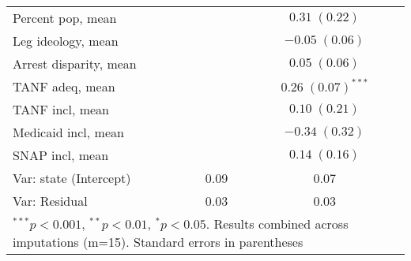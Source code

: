\begin{table}
\begin{center}
\begin{tabular}{l c c }
Percent pop, mean          &                         & $0.31 \; (0.22)$       \\
Leg ideology, mean         &                         & $-0.05 \; (0.06)$      \\
Arrest disparity, mean     &                         & $0.05 \; (0.06)$       \\
TANF adeq, mean            &                         & $0.26 \; (0.07)^{***}$ \\
TANF incl, mean            &                         & $0.10 \; (0.21)$       \\
Medicaid incl, mean        &                         & $-0.34 \; (0.32)$      \\
SNAP incl, mean            &                         & $0.14 \; (0.16)$       \\
\hline
Var: state (Intercept)     & 0.09                    & 0.07                   \\
Var: Residual              & 0.03                    & 0.03                   \\
\hline
\multicolumn{3}{l}{\scriptsize{$^{***}p<0.001$, $^{**}p<0.01$, $^*p<0.05$. Results combined across imputations (m=15). Standard errors in parentheses}}
\end{tabular}
\label{table:coefficients}
\end{center}
\end{table}
